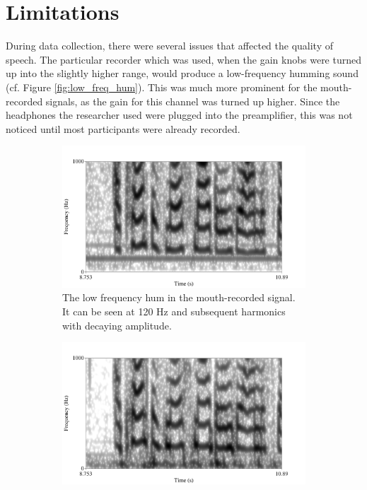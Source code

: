 \section{Limitations}
\label{chap2:limitations}

During data collection, there were several issues that affected the quality of speech.  
The particular recorder which was used, when the gain knobs were turned up into the slightly higher range, would produce a low-frequency humming sound (cf. Figure \ref{fig:low_freq_hum}).  This was much more prominent for the mouth-recorded signals, as the gain for this channel was turned up higher.  Since the headphones the researcher used were plugged into the preamplifier, this was not noticed until most participants were already recorded.

\begin{figure}[h!]
\centering
\begin{subfigure}{0.475\textwidth}
  \centering
  \includegraphics[width=1\linewidth]{figure/low_frequency_hum.png}
  \caption{The low frequency hum in the mouth-recorded signal.  It can be seen at 120 Hz and subsequent harmonics with decaying amplitude.}
  \label{fig:low_freq_hum-mouth}
\end{subfigure}%
\hfill
\begin{subfigure}{0.475\textwidth}
  \centering
  \includegraphics[width=1\linewidth]{figure/low_frequency_hum-ear.png}

\end{subfigure}
\end{figure}
